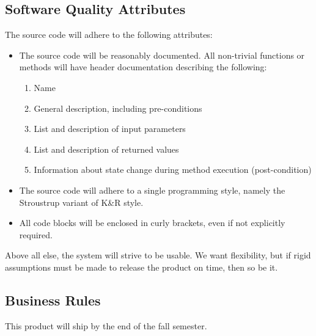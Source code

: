\documentclass{article}
\begin{document}
\subsection{Software Quality Attributes}
The source code will adhere to the following attributes:
\begin{itemize}
    \item The source code will be reasonably documented.  All non-trivial functions or methods will have header documentation describing the following:
        \begin{enumerate}
            \item Name
            \item General description, including pre-conditions
            \item List and description of input parameters
            \item List and description of returned values
            \item Information about state change during method execution (post-condition)
        \end{enumerate}
    \item The source code will adhere to a single programming style, namely the Stroustrup variant of K\&R style.
    \item All code blocks will be enclosed in curly brackets, even if not explicitly required.
\end{itemize}

Above all else, the system will strive to be usable.  We want flexibility, but if rigid assumptions must be made to release the product on time, then so be it.



\subsection{Business Rules}
This product will ship by the end of the fall semester.
\end{document}
